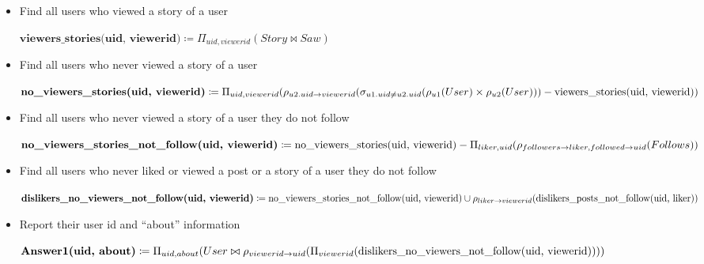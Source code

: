 \documentclass[12pt]{article}
\begin{document}
\begin{enumerate}[1.]
\begin{itemize}
        \item Find all users who viewed a story of a user

        \begin{mdframed}
        $\textbf{viewers\_stories(uid, viewerid)} \coloneqq \Pi_{uid, viewerid}(Story \bowtie Saw)$
        \end{mdframed}

        \item Find all users who never viewed a story of a user

        \begin{mdframed}
        $\textbf{no\_viewers\_stories(uid, viewerid)} \coloneqq \Pi_{uid, viewerid}(\rho_{u2.uid \to viewerid}(\sigma_{u1.uid \neq u2.uid}(\\\rho_{u1}(User) \times \rho_{u2}(User))) - \text{viewers\_stories(uid, viewerid)})$
        \end{mdframed}

        \item Find all users who never viewed a story of a user they do not follow

        \begin{mdframed}
        $\textbf{no\_viewers\_stories\_not\_follow(uid, viewerid)} \coloneqq \\\text{no\_viewers\_stories(uid, viewerid)} - \Pi_{liker, uid}(\rho_{followers \to liker, followed \to uid}(Follows))$
        \end{mdframed}

        \item Find all users who never liked or viewed a post or a story of a user they
        do not follow

        \begin{mdframed}
        $\textbf{dislikers\_no\_viewers\_not\_follow(uid, viewerid)} \coloneqq \\ \text{no\_viewers\_stories\_not\_follow(uid, viewerid)} \cup \\ \rho_{liker \to viewerid}(\text{dislikers\_posts\_not\_follow(uid, liker)})$
        \end{mdframed}

        \item Report their user id and ``about'' information

        \begin{mdframed}
        $\textbf{Answer1(uid, about)} \coloneqq \Pi_{uid, about}(User \bowtie \rho_{viewerid \to uid}(\\\Pi_{viewerid}(\text{dislikers\_no\_viewers\_not\_follow(uid, viewerid)})))$
        \end{mdframed}


\end{itemize}
\end{enumerate}
\end{document}

